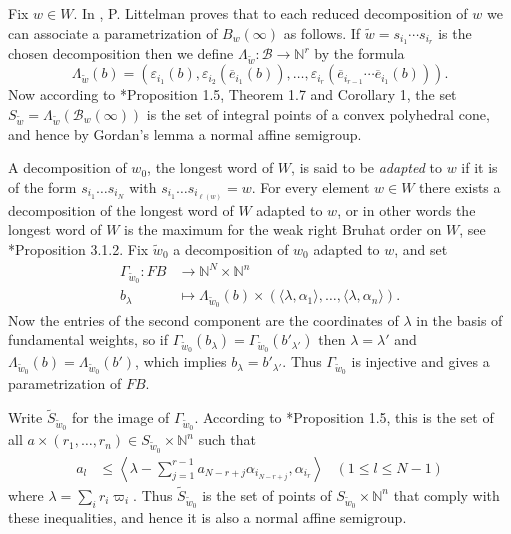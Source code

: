 \documentclass[11pt,fleqn]{article}
\newcommand\NN{\mathbb N}
\renewcommand\to{\longrightarrow}
\newcommand\B{\mathcal B}
\newcommand\flagbasis{FB}
\begin{document}
Fix $w \in W$. In \cite{Lit}, P. Littelman proves that to each reduced 
decomposition of $w$ we can associate a parametrization of $B_w(\infty)$ as 
follows. If $\tilde w = s_{i_1} \cdots s_{i_r}$ is the chosen decomposition 
then we define $\Lambda_{\tilde w}: \B \to \NN^r$ by the formula
\[
  \Lambda_{\tilde w}(b) 
    = (\varepsilon_{i_1}(b), \varepsilon_{i_{2}}(\overline e_{i_1}(b)), \ldots,
    \varepsilon_{i_r}(\overline e_{i_{r-1}} \cdots \overline e_{i_1}(b))).
\]
Now according to \cite{Lit}*{Proposition 1.5, Theorem 1.7 and Corollary 1}, 
the set $S_{\tilde w} = \Lambda_{\tilde w}(\B_w(\infty))$ is the set of 
integral points of a convex polyhedral cone, and hence by Gordan's lemma a 
normal affine semigroup. 

A decomposition of $w_0$, the longest word of $W$, is said to be \emph{adapted}
to $w$ if it is of the form $s_{i_1} \ldots s_{i_N}$ with $s_{i_1} \ldots 
s_{i_{\ell(w)}} = w$. For every element $w \in W$ there exists a decomposition 
of the longest word of $W$ adapted to $w$, or in other words the longest word 
of $W$ is the maximum for the weak right Bruhat order on $W$, see 
\cite{BB}*{Proposition 3.1.2}. Fix $\tilde w_0$ a decomposition of $w_0$ 
adapted to $w$, and set
\begin{align*}
\Gamma_{\tilde w_0}:
   FB &\to \NN^{N} \times \NN^n \\
   b_\lambda & \longmapsto \Lambda_{\tilde w_0}(b) \times 
   (\langle \lambda, \alpha_1 \rangle, \ldots, \langle \lambda, \alpha_n 
   \rangle).
\end{align*}
Now the entries of the second component are the coordinates of $\lambda$ in 
the basis of fundamental weights, so if $\Gamma_{\tilde w_0}(b_\lambda) = 
\Gamma_{\tilde w_0}(b'_{\lambda'})$ then $\lambda = \lambda'$ and 
$\Lambda_{\tilde w_0}(b) = \Lambda_{\tilde w_0}(b')$, which implies 
$b_\lambda = b'_{\lambda'}$. Thus $\Gamma_{\tilde w_0}$ is injective and gives 
a parametrization of $\flagbasis$. 

Write $\tilde S_{\tilde w_0}$ for the image of $\Gamma_{\tilde w_0}$. 
According to \cite{Lit}*{Proposition 1.5}, this is the set of all 
$a \times (r_1, \ldots, r_n) \in S_{\tilde w_0} \times \NN^n$ such that
\begin{align*}
a_l 
  &\leq \left\langle \lambda - \sum_{j=1}^{r-1} a_{N-r+j} \alpha_{i_{N-r+j}}, 
  \alpha_{i_r} \right\rangle
& (1 \leq l \leq N-1)
\end{align*}
where $\lambda = \sum_i r_i \varpi_i$. Thus $\tilde S_{\tilde w_0}$ is the set 
of points of $S_{\tilde w_0} \times \NN^n$ that comply with these 
inequalities, and hence it is also a normal affine semigroup. 
\end{document}
